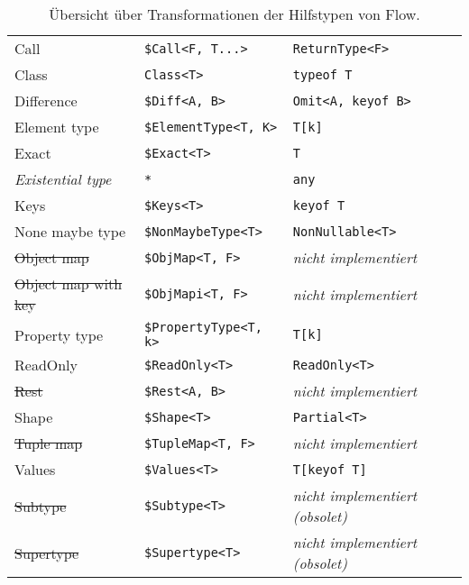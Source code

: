 \begin{table}[tbh]
  \footnotesize
  \begin{tabu} to 
    \midrule
     &  &   \\
    \midrule
    Call                        & \texttt{\$Call<F, T...>}        & \texttt{ReturnType<F>}        \\
    Class                       & \texttt{Class<T>}               & \texttt{typeof T}             \\
    Difference                  & \texttt{\$Diff<A, B>}           & \texttt{Omit<A, keyof B>}     \\
    Element type                & \texttt{\$ElementType<T, K>}    & \texttt{T[k]}                 \\
    Exact                       & \texttt{\$Exact<T>}             & \texttt{T}                    \\
    \textit{Existential type}   & \texttt{*}                      & \texttt{any}                  \\
    Keys                        & \texttt{\$Keys<T>}              & \texttt{keyof T}              \\
    None maybe type             & \texttt{\$NonMaybeType<T>}      & \texttt{NonNullable<T>}       \\
    \sout{Object map}           & \texttt{\$ObjMap<T, F>}         & \textit{nicht implementiert}  \\
    \sout{Object map with key}  & \texttt{\$ObjMapi<T, F>}        & \textit{nicht implementiert}  \\
    Property type               & \texttt{\$PropertyType<T, k>}   & \texttt{T[k]}                 \\
    ReadOnly                    & \texttt{\$ReadOnly<T>}          & \texttt{ReadOnly<T>}          \\
    \sout{Rest}                 & \texttt{\$Rest<A, B>}           & \textit{nicht implementiert}  \\
    Shape                       & \texttt{\$Shape<T>}             & \texttt{Partial<T>}           \\
    \sout{Tuple map}            & \texttt{\$TupleMap<T, F>}       & \textit{nicht implementiert}  \\
    Values                      & \texttt{\$Values<T>}            & \texttt{T[keyof T]}           \\
    \sout{Subtype}              & \texttt{\$Subtype<T>}           & \textit{nicht implementiert (obsolet)} \\
    \sout{Supertype}            & \texttt{\$Supertype<T>}         & \textit{nicht implementiert (obsolet)} \\
    \midrule
  \end{tabu}
  \caption{Übersicht über Transformationen der Hilfstypen von Flow.}
  \label{tab:transformation-utility-types}
\end{table}
